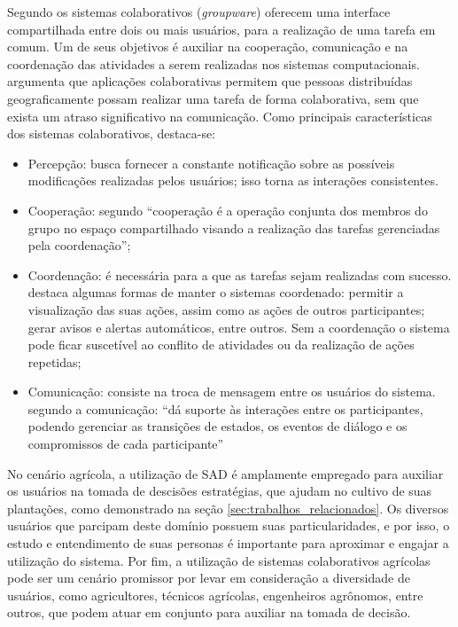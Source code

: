 \documentclass[12pt]{article}
\begin{document}
Segundo  os sistemas colaborativos (\textit{groupware}) oferecem uma interface compartilhada entre dois ou mais usuários, para a realização de uma tarefa em comum. Um de seus objetivos é auxiliar na cooperação, comunicação e na coordenação das atividades a serem realizadas nos sistemas computacionais.  argumenta que aplicações colaborativas permitem que pessoas distribuídas geograficamente possam realizar uma tarefa de forma colaborativa, sem que exista um atraso significativo na comunicação. Como principais características dos sistemas colaborativos, destaca-se:

\begin{itemize}
	\item Percepção: busca fornecer a constante notificação sobre as possíveis modificações realizadas pelos usuários; isso torna as interações consistentes.
	\item Cooperação: segundo \cite{Fuks:2003} ``cooperação é a operação conjunta dos membros do grupo no espaço compartilhado visando a realização das tarefas gerenciadas pela coordenação'';
	\item Coordenação: é necessária para a que as tarefas sejam realizadas com sucesso.  destaca algumas formas de manter o sistemas coordenado: permitir a visualização das suas ações, assim como as ações de outros participantes; gerar avisos e alertas automáticos, entre outros. Sem a coordenação o sistema pode ficar suscetível ao conflito de atividades ou da realização de ações repetidas;
	\item Comunicação: consiste na troca de mensagem entre os usuários do sistema. segundo \cite{Fuks:2003} a comunicação: ``dá suporte às interações entre os participantes, podendo gerenciar as transições de estados, os eventos de diálogo e os compromissos de cada participante''
\end{itemize}

No cenário agrícola, a utilização de SAD é amplamente empregado para auxiliar os usuários na tomada de descisões estratégias, que ajudam no cultivo de suas plantações, como demonstrado na seção \ref{sec:trabalhos_relacionados}. Os diversos usuários que parcipam deste domínio possuem suas particularidades, e por isso, o estudo e entendimento de suas personas é importante para aproximar e engajar a utilização do sistema. Por fim, a utilização de sistemas colaborativos agrícolas pode ser um cenário promissor por levar em consideração a diversidade de usuários, como agricultores, técnicos agrícolas, engenheiros agrônomos, entre outros, que podem atuar em conjunto para auxiliar na tomada de decisão.
\end{document}
